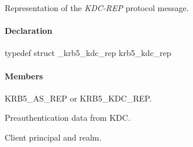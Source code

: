 \documentclass[letterpaper,10pt,english]{sphinxmanual}
\begin{document}
Representation of the \emph{KDC-REP} protocol message.


\paragraph{Declaration}
\label{appdev/refs/types/krb5_kdc_rep:declaration}
typedef struct \_krb5\_kdc\_rep  krb5\_kdc\_rep


\paragraph{Members}
\label{appdev/refs/types/krb5_kdc_rep:members}

\begin{fulllineitems}
\label{appdev/refs/types/krb5_kdc_rep:c.krb5_kdc_rep.magic}
\end{fulllineitems}


\begin{fulllineitems}
\label{appdev/refs/types/krb5_kdc_rep:c.krb5_kdc_rep.msg_type}
KRB5\_AS\_REP or KRB5\_KDC\_REP.

\end{fulllineitems}


\begin{fulllineitems}
\label{appdev/refs/types/krb5_kdc_rep:c.krb5_kdc_rep.padata}
Preauthentication data from KDC.

\end{fulllineitems}


\begin{fulllineitems}
\label{appdev/refs/types/krb5_kdc_rep:c.krb5_kdc_rep.client}
Client principal and realm.

\end{fulllineitems}
\end{document}
